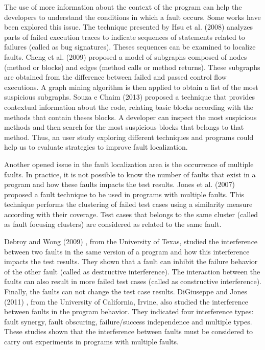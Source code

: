 \documentclass[12pt,a4paper,espaco=umemeio,noindentfirst,oneside,openany,tocpage=plain,pnumromarab,ruledheader,time,anapcustomindent]{sty/abnt}
\begin{document}
The use of more information about the context of the program can help the developers to understand the conditions in which a fault occurs. Some works 
have been explored this issue. The technique presented by Hsu et al. (2008) \cite{hsu2008} analyzes parts of failed execution traces to 
indicate sequences of statements related to failures (called as bug signatures). Theses sequences can be examined to localize faults. 
Cheng et al. (2009) \cite{cheng2009} proposed a model of subgraphs composed of nodes (method or blocks) and edges (method calls or 
method returns). These subgraphs are obtained from the difference between failed and passed control flow executions. 
A graph mining algorithm is then applied to obtain a list of the most suspicious subgraphs. 
Souza e Chaim (2013) \cite{souza2013} proposed a technique that provides contextual information about the code, relating 
basic blocks according with the methods that contain theses blocks. A developer can inspect the most suspicious methods and then search for the most 
suspicious blocks that belongs to that method. 
Thus, an user study exploring different techniques and programs could help us to evaluate strategies to improve fault localization.

Another opened issue in the fault localization area is the occurrence of multiple faults. In practice, it is not possible to know the number of 
faults that exist in a program and how these faults impacts the test results. Jones et al. (2007) \cite{jones2007} proposed a fault technique to 
be used in programs with multiple faults. This technique performs the clustering of failed test cases using a similarity measure according with 
their coverage. Test cases that belongs to the same cluster (called as fault focusing clusters) are considered as related to the same fault. 

Debroy and Wong (2009) \cite{debroy2009}, from the University of Texas, studied the interference between two faults in the same version of a program 
and how this interference impacts the test results. They shown 
that a fault can inhibit the failure behavior of the other fault (called as destructive interference). The interaction between the faults can also 
result in more failed test cases (called as constructive interference).  Finally, the faults can not change the test case results. DiGiuseppe and 
Jones (2011) \cite{digiuseppe2011}, from the University of California, Irvine, also studied the interference between faults in the program behavior. They 
indicated four interference types: fault synergy, fault obscuring, failure/success independence and multiple types. These studies shown that the 
interference between faults must be considered to carry out experiments in programs with multiple faults. 
\end{document}
